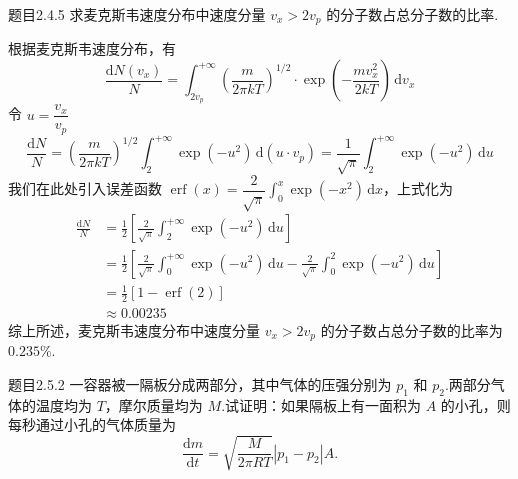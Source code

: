 \begin{question}{题目2.4.5}
    求麦克斯韦速度分布中速度分量 $v_x > 2v_p$ 的分子数占总分子数的比率.
\end{question}
\begin{solution}
    根据麦克斯韦速度分布，有
    $$
        \frac{\mathrm{d}N(v_x)}{N}
        = \int_{2v_p}^{+\infty} \left(\frac{m}{2 \pi kT}\right)^{1/2} \cdot \exp\left(-\frac{mv_x^2}{2kT}\right) \,\mathrm{d}v_x
    $$
    令 $u =  \dfrac{v_x}{v_p}$
    $$
        \frac{\mathrm{d}N}{N}
        = \left(\frac{m}{2 \pi kT}\right)^{1/2} \int_{2}^{+\infty} \exp(-u^2) \,\mathrm{d}(u \cdot v_p)
        = \frac{1}{\sqrt{\pi}}\int_{2}^{+\infty} \exp(-u^2) \,\mathrm{d}u
    $$
    我们在此处引入误差函数 $\displaystyle \operatorname{erf}(x) = \dfrac{2}{\sqrt{\pi}}\int_0^x \exp(-x^2) \,\mathrm{d}x$，上式化为
    $$
        \begin{aligned}
            \frac{\mathrm{d}N}{N}
             & = \frac{1}{2} \left[ \frac{2}{\sqrt{\pi}}\int_{2}^{+\infty} \exp(-u^2) \,\mathrm{d}u \right] \\
             & = \frac{1}{2} \left[\frac{2}{\sqrt{\pi}}\int_0^{+\infty}\exp(-u^2) \,\mathrm{d}u
            - \frac{2}{\sqrt{\pi}}\int_0^2\exp(-u^2) \,\mathrm{d}u  \right]                                 \\
             & = \frac{1}{2} \left[ 1- \operatorname{erf} (2)\right]                                        \\
             & \approx 0.00235
        \end{aligned}
    $$
    综上所述，麦克斯韦速度分布中速度分量 $v_x > 2v_p$ 的分子数占总分子数的比率为 $0.235\%$.
\end{solution}

\begin{question}{题目2.5.2}
    一容器被一隔板分成两部分，其中气体的压强分别为 $p_1$ 和 $p_2$.两部分气体的温度均为 $T$，摩尔质量均为 $M$.试证明：如果隔板上有一面积为 $A$ 的小孔，则每秒通过小孔的气体质量为
    $$
        \frac{\mathrm{d}m}{\mathrm{d}t} = \sqrt{\frac{M}{2\pi RT}} |p_1 - p_2| A.
    $$
\end{question}

